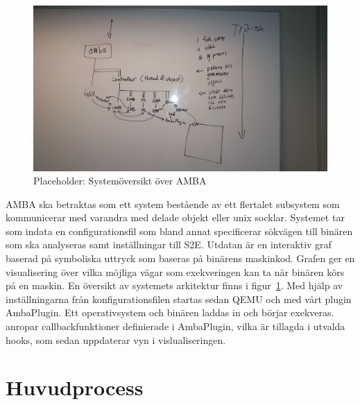 


\begin{figure}
    \centering
    \includegraphics[width=\textwidth]{figures/arkitektur.jpg}
    \caption{Placeholder: Systemöversikt över AMBA}\label{fig:arkitektur}
\end{figure}

%

AMBA ska betraktas som ett system bestående av ett flertalet subsystem som
kommunicerar med varandra med delade objekt eller unix socklar. Systemet tar
som indata en configurationsfil som bland annat specificerar sökvägen till
binären som ska analyseras samt inställningar till S2E. Utdatan är en
interaktiv graf baserad på symboliska uttryck som baseras på binärens maskinkod.
Grafen ger en visualisering över vilka möjliga vägar som exekveringen kan ta när
binären körs på en maskin. En översikt av systemets arkitektur finns i
figur~\ref{fig:arkitektur}. Med hjälp av inställningarna från
konfigurationsfilen startas sedan QEMU och \stoe{} med vårt \stoe{} plugin
AmbaPlugin. Ett operativsystem och binären laddas in och börjar exekveras.
\stoe{} anropar callbackfunktioner definierade i AmbaPlugin, vilka är tillagda i
utvalda \stoe{} hooks, som sedan uppdaterar vyn i vislualiseringen.

\section{Huvudprocess}


